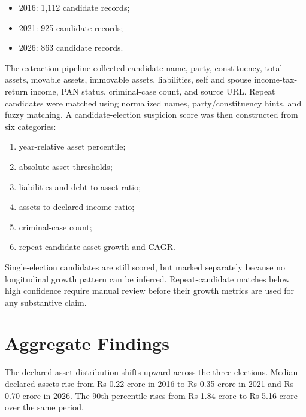 \documentclass[11pt]{article}
\begin{document}
\begin{itemize}
  \item 2016: 1,112 candidate records;
  \item 2021: 925 candidate records;
  \item 2026: 863 candidate records.
\end{itemize}

The extraction pipeline collected candidate name, party, constituency, total assets, movable assets, immovable assets, liabilities, self and spouse income-tax-return income, PAN status, criminal-case count, and source URL. Repeat candidates were matched using normalized names, party/constituency hints, and fuzzy matching. A candidate-election suspicion score was then constructed from six categories:

\begin{enumerate}
  \item year-relative asset percentile;
  \item absolute asset thresholds;
  \item liabilities and debt-to-asset ratio;
  \item assets-to-declared-income ratio;
  \item criminal-case count;
  \item repeat-candidate asset growth and CAGR.
\end{enumerate}

Single-election candidates are still scored, but marked separately because no longitudinal growth pattern can be inferred. Repeat-candidate matches below high confidence require manual review before their growth metrics are used for any substantive claim.

\section{Aggregate Findings}

The declared asset distribution shifts upward across the three elections. Median declared assets rise from Rs 0.22 crore in 2016 to Rs 0.35 crore in 2021 and Rs 0.70 crore in 2026. The 90th percentile rises from Rs 1.84 crore to Rs 5.16 crore over the same period.
\end{document}
